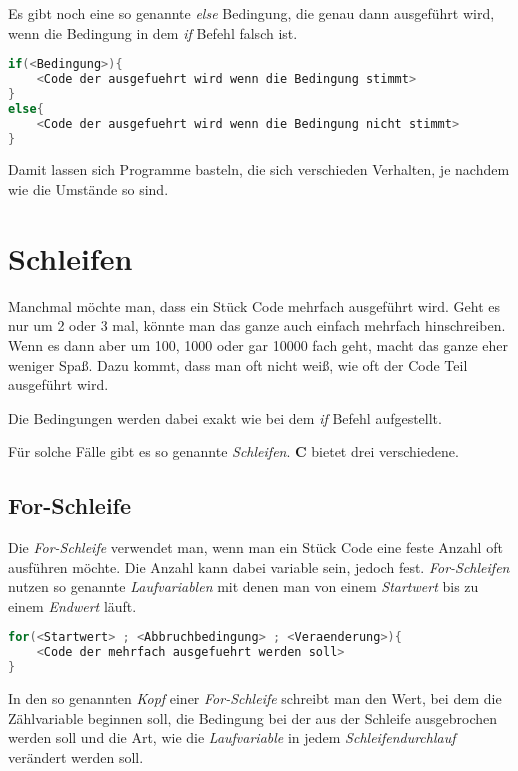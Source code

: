 \documentclass[c_worksheet.tex]{subfiles}
\begin{document}
Es gibt noch eine so genannte \emph{else} Bedingung, die genau dann ausgeführt wird, wenn die Bedingung in dem \emph{if} Befehl falsch ist.

\begin{lstlisting}[language=c]
if(<Bedingung>){
	<Code der ausgefuehrt wird wenn die Bedingung stimmt>
}
else{
	<Code der ausgefuehrt wird wenn die Bedingung nicht stimmt>
}
\end{lstlisting}

Damit lassen sich Programme basteln, die sich verschieden Verhalten, je nachdem wie die Umstände so sind.





\section{Schleifen} 

Manchmal möchte man, dass ein Stück Code mehrfach ausgeführt wird. Geht es nur um 2 oder 3 mal, könnte man das ganze auch einfach mehrfach hinschreiben. Wenn es dann aber um 100, 1000 oder gar 10000 fach geht, macht das ganze eher weniger Spaß. Dazu kommt, dass man oft nicht weiß, wie oft der Code Teil ausgeführt wird.

Die Bedingungen werden dabei exakt wie bei dem \emph{if} Befehl aufgestellt.

Für solche Fälle gibt es so genannte \emph{Schleifen}. \textbf{C} bietet drei verschiedene.

\subsection{For-Schleife}

Die \emph{For-Schleife} verwendet man, wenn man ein Stück Code eine feste Anzahl oft ausführen möchte. Die Anzahl kann dabei variable sein, jedoch fest. \emph{For-Schleifen} nutzen so genannte \emph{Laufvariablen} mit denen man von einem \emph{Startwert} bis zu einem \emph{Endwert} läuft.

\begin{lstlisting}[language=c]
for(<Startwert> ; <Abbruchbedingung> ; <Veraenderung>){
	<Code der mehrfach ausgefuehrt werden soll>
}
\end{lstlisting}

In den so genannten \emph{Kopf} einer \emph{For-Schleife} schreibt man den Wert, bei dem die Zählvariable beginnen soll, die Bedingung bei der aus der Schleife ausgebrochen werden soll und die Art, wie die \emph{Laufvariable} in jedem \emph{Schleifendurchlauf} verändert werden soll.
\end{document}
